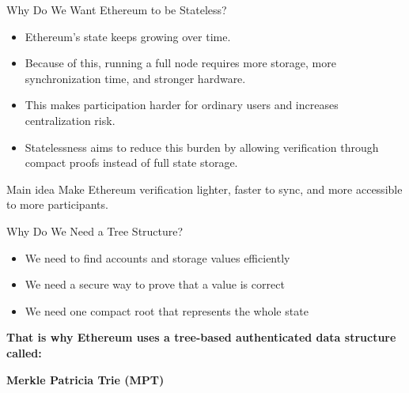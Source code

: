 \documentclass{beamer}
\begin{document}
\begin{frame}{Why Do We Want Ethereum to be Stateless?}
\begin{itemize}
    \item Ethereum's state keeps growing over time.
    \item Because of this, running a full node requires more storage, more synchronization time, and stronger hardware.
    \item This makes participation harder for ordinary users and increases centralization risk.
    \item Statelessness aims to reduce this burden by allowing verification through compact proofs instead of full state storage.
\end{itemize}

\vspace{0.3cm}
\begin{block}{Main idea}
Make Ethereum verification lighter, faster to sync, and more accessible to more participants.
\end{block}
\end{frame}
\begin{frame}{Why Do We Need a Tree Structure?}
    \begin{itemize}
    \item We need to find accounts and storage values efficiently
    \item We need a secure way to prove that a value is correct
    \item We need one compact root that represents the whole state
\end{itemize}
\vspace{0.3cm}
\textbf{That is why Ethereum uses a tree-based authenticated data structure called:}
\begin{center}
\textbf{Merkle Patricia Trie (MPT)}
\end{center}
\end{frame}


    
\end{document}
